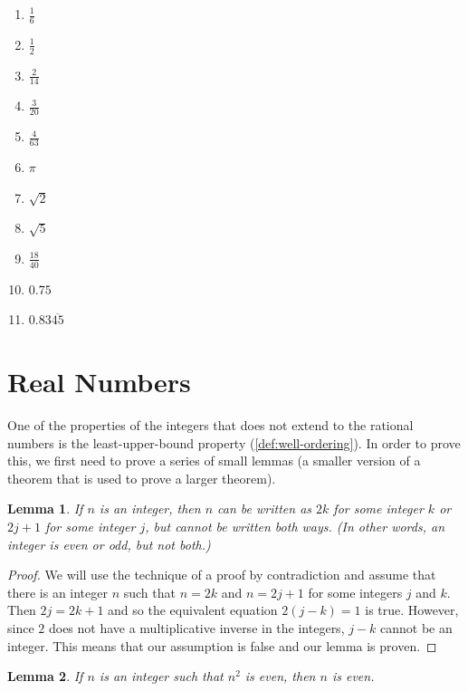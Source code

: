 \documentclass[
]{book}
\providecommand{\tightlist}{%
  \setlength{\itemsep}{0pt}\setlength{\parskip}{0pt}}
\let\stdsection\section
\renewcommand\section{\newpage\stdsection}
\newtheorem{lemma}{Lemma}[chapter]
\theoremstyle{definition}
\theoremstyle{definition}
\theoremstyle{definition}
\theoremstyle{definition}
\theoremstyle{remark}
\begin{document}
\begin{enumerate}
  \begin{enumerate}
  \def\labelenumii{\alph{enumii}.}
  \tightlist
  \item
    \(\frac{1}{6}\)
  \item
    \(\frac{1}{2}\)
  \item
    \(\frac{2}{14}\)
  \item
    \(\frac{3}{20}\)
  \item
    \(\frac{4}{63}\)
  \item
    \(\pi\)
  \item
    \(\sqrt{2}\)
  \item
    \(\sqrt{5}\)
  \item
    \(\frac{18}{40}\)
  \item
    \(0.75\)
  \item
    \(0.83\overline{45}\)
  \end{enumerate}
\end{enumerate}

\hypertarget{reals}{%
\section{Real Numbers}\label{reals}}

One of the properties of the integers that does not extend to the rational numbers is the least-upper-bound property (\ref{def:well-ordering}). In order to prove this, we first need to prove a series of small lemmas (a smaller version of a theorem that is used to prove a larger theorem).

\begin{lemma}
If \(n\) is an integer, then \(n\) can be written as \(2k\) for some integer \(k\) or \(2j+1\) for some integer \(j\), but cannot be written both ways. (In other words, an integer is even or odd, but not both.)
\end{lemma}

\begin{proof}
We will use the technique of a proof by contradiction and assume that there is an integer \(n\) such that \(n=2k\) and \(n=2j+1\) for some integers \(j\) and \(k\). Then \(2j=2k+1\) and so the equivalent equation \(2(j-k)=1\) is true. However, since \(2\) does not have a multiplicative inverse in the integers, \(j-k\) cannot be an integer. This means that our assumption is false and our lemma is proven.
\end{proof}

\begin{lemma}
If \(n\) is an integer such that \(n^2\) is even, then \(n\) is even.
\end{lemma}
\end{document}

